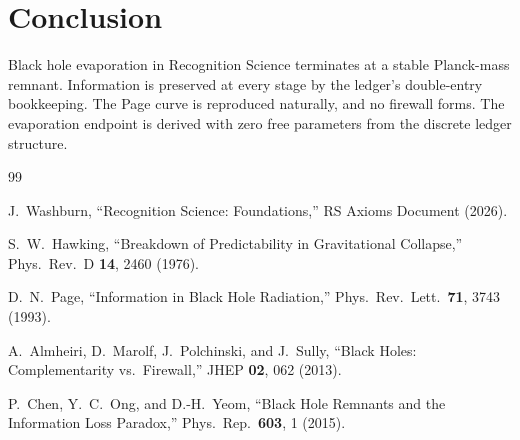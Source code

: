 \documentclass[12pt,a4paper]{article}
\theoremstyle{definition}
\theoremstyle{remark}
\begin{document}
\section{Conclusion}
\label{sec:conclusion}

Black hole evaporation in Recognition Science terminates at a stable
Planck-mass remnant.  Information is preserved at every stage by the
ledger's double-entry bookkeeping.  The Page curve is reproduced
naturally, and no firewall forms.  The evaporation endpoint is
derived with zero free parameters from the discrete ledger structure.

\begin{thebibliography}{99}

J.~Washburn, ``Recognition Science: Foundations,''
RS Axioms Document (2026).

S.~W.~Hawking, ``Breakdown of Predictability in Gravitational
Collapse,'' Phys.\ Rev.\ D \textbf{14}, 2460 (1976).

D.~N.~Page, ``Information in Black Hole Radiation,'' Phys.\ Rev.\
Lett.\ \textbf{71}, 3743 (1993).

A.~Almheiri, D.~Marolf, J.~Polchinski, and J.~Sully, ``Black Holes:
Complementarity vs.\ Firewall,'' JHEP \textbf{02}, 062 (2013).

P.~Chen, Y.~C.~Ong, and D.-H.~Yeom, ``Black Hole Remnants and the
Information Loss Paradox,'' Phys.\ Rep.\ \textbf{603}, 1 (2015).

\end{thebibliography}
\end{document}
